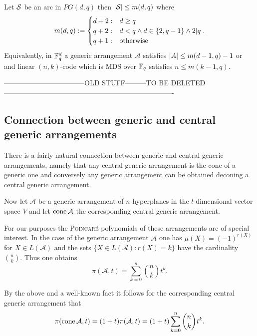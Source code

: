 \documentclass[a4paper]{article}
\begin{document}
\begin{conjecture}
  Let $\mathcal{S}$ be an arc in $PG(d,q)$ then $\left|\mathcal{S}\right|\leq m(d,q)$ where
  \begin{equation}
    m(d,q):=\begin{cases}
      d+2 :& d \geq q\\
      q+2 :& d<q \wedge d\in\{2,q-1\} \wedge 2|q\\
      q+1 :& \text{otherwise}
    \end{cases}\text{.}
  \end{equation} 
  Equivalently, in $\mathbb{F}_{q}^d$ a generic arrangement $\mathcal{A}$ satisfies $\left|A\right|\leq m(d-1,q)-1$ or and linear $(n,k)$-code which is MDS over $\mathbb{F}_{q}$ satisfies $n\leq m(k-1,q)$.
\end{conjecture}

-----------------------------------OLD STUFF---------TO BE DELETED-------------------------------------------------------------------------

\subsection{Connection between generic and central generic arrangements}

There is a fairly natural connection between generic and central generic arrangements, namely that any central generic arrangement is the cone of a generic one and conversely any generic arrangement can be obtained deconing a central generic arrangement.

Now let $\mathcal{A}$ be a generic arrangement of $n$ hyperplanes in the $l$-dimensional vector space $V$ and let $\mathop\mathrm{cone}{\mathcal{A}}$ the corresponding central generic arrangement.

For our purposes the \textsc{Poincaré} polynomials of these arrangements are of special interest.
In the case of the generic arrangement $\mathcal{A}$ one has $\mu(X)=(-1)^{r(X)}$ for $X\in L(\mathcal{A})$ and the sets $\{X\in L(\mathcal{A}):r(X)=k\}$ have the cardinality $\binom{n}{k}$. Thus one obtains
\begin{equation}
  \pi(\mathcal{A},t)=\sum_{k=0}^n{\binom{n}{k}t^k}\text{.}
\end{equation}

By the above and a well-known fact it follows for the corresponding central generic arrangement that
\begin{equation}
  \pi(\cone{\mathcal{A}},t)=(1+t)\pi(\mathcal{A},t)=(1+t)\sum_{k=0}^n{\binom{n}{k}t^k}\text{.}
\end{equation}
\end{document}
